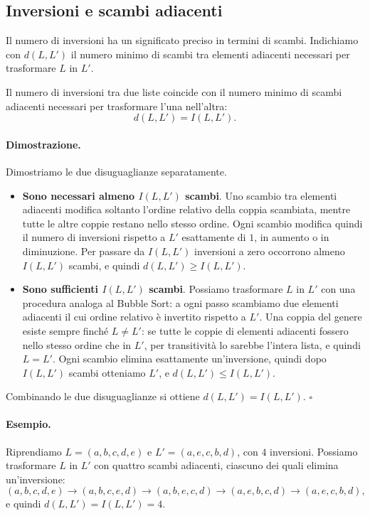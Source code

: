 \subsection{Inversioni e scambi adiacenti}\label{sec:inversioni-scambi}
Il numero di inversioni ha un significato preciso in termini di scambi. Indichiamo con $d(L, L')$ il numero minimo di scambi tra elementi adiacenti necessari per trasformare $L$ in $L'$.

\begin{lemma}\label{lem:inversioni}
Il numero di inversioni tra due liste coincide con il numero minimo di scambi adiacenti necessari per trasformare l'una nell'altra:
\[
d(L, L') = I(L, L').
\]
\end{lemma}

\paragraph{Dimostrazione.}
Dimostriamo le due disuguaglianze separatamente.
\begin{itemize}
    \item \textbf{Sono necessari almeno $I(L, L')$ scambi}. Uno scambio tra elementi adiacenti modifica soltanto l'ordine relativo della coppia scambiata, mentre tutte le altre coppie restano nello stesso ordine. Ogni scambio modifica quindi il numero di inversioni rispetto a $L'$ esattamente di $1$, in aumento o in diminuzione. Per passare da $I(L, L')$ inversioni a zero occorrono almeno $I(L, L')$ scambi, e quindi $d(L, L') \ge I(L, L')$.
    \item \textbf{Sono sufficienti $I(L, L')$ scambi}. Possiamo trasformare $L$ in $L'$ con una procedura analoga al Bubble Sort: a ogni passo scambiamo due elementi adiacenti il cui ordine relativo è invertito rispetto a $L'$. Una coppia del genere esiste sempre finché $L \ne L'$: se tutte le coppie di elementi adiacenti fossero nello stesso ordine che in $L'$, per transitività lo sarebbe l'intera lista, e quindi $L = L'$. Ogni scambio elimina esattamente un'inversione, quindi dopo $I(L, L')$ scambi otteniamo $L'$, e $d(L, L') \le I(L, L')$.
\end{itemize}
Combinando le due disuguaglianze si ottiene $d(L, L') = I(L, L')$. \hfill $\square$

\paragraph{Esempio.}
Riprendiamo $L = (a, b, c, d, e)$ e $L' = (a, e, c, b, d)$, con $4$ inversioni. Possiamo trasformare $L$ in $L'$ con quattro scambi adiacenti, ciascuno dei quali elimina un'inversione:
\[
(a, b, c, d, e) \to (a, b, c, e, d) \to (a, b, e, c, d) \to (a, e, b, c, d) \to (a, e, c, b, d),
\]
e quindi $d(L, L') = I(L, L') = 4$.

